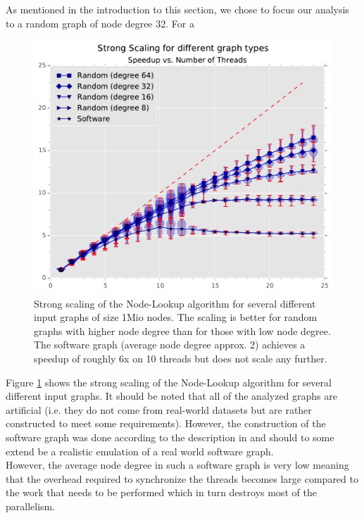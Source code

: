  As mentioned in the introduction to this section, we chose to focus our analysis to a random graph of node degree 32.
	For a 
%
\begin{figure}[ht]
	\centering
	\includegraphics[width=\columnwidth]{plots/strongscaling_gtALL_n1000000.pdf}
	\caption{Strong scaling of the Node-Lookup algorithm for several different input graphs of size 1Mio nodes. The scaling is better for random graphs with higher node degree than for those with low node degree.
		The software graph (average node degree approx. 2) achieves a speedup of roughly 6x on 10 threads but does not scale any further.
}
	\label{fig:strongscaling_graphtypes}
\end{figure}
%
Figure \ref{fig:strongscaling_graphtypes} shows the strong scaling of the Node-Lookup algorithm for several different input graphs.
It should be noted that all of the analyzed graphs are artificial (i.e. they do not come from real-world datasets but are rather constructed to meet some requirements).
However, the construction of the software graph was done according to the description in \cite{musco2014generative} and should to some extend be a realistic emulation of a real world software graph. \\
However, the average node degree in such a software graph is very low meaning that the overhead required to synchronize the threads becomes large compared to the work that needs to be performed which in turn destroys most of the parallelism. \\

